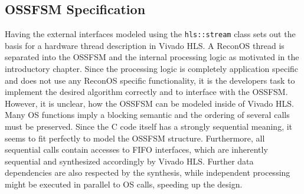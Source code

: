 \subsection{\acs{OSSFSM} Specification}
Having the external interfaces modeled using the \lstinline{hls::stream}
class sets out the basis for a hardware thread description in Vivado HLS. A
ReconOS thread is separated into the \ac{OSSFSM} and the internal processing
logic as motivated in the introductory chapter. Since the processing logic is
completely application specific and does not use any ReconOS specific
functionality, it is the developers task to implement the desired algorithm
correctly and to interface with the \ac{OSSFSM}. However, it is unclear, how
the \ac{OSSFSM} can be modeled inside of Vivado HLS. Many \ac{OS} functions
imply a blocking semantic and the ordering of several calls must be preserved.
Since the C code itself has a strongly sequential meaning, it seems to fit
perfectly to model the \ac{OSSFSM} structure. Furthermore, all sequential calls
contain accesses to \ac{FIFO} interfaces, which are inherently sequential and
synthesized accordingly by Vivado HLS. Further data dependencies are also
respected by the synthesis, while independent processing might be executed in
parallel to \ac{OS} calls, speeding up the design.


